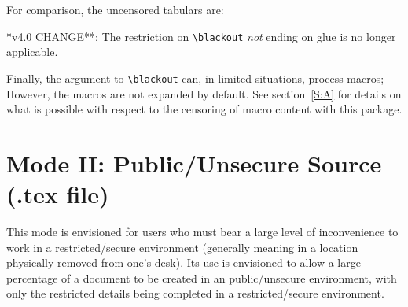 \documentclass{article}
\begin{document}

\StopCensoring

For comparison, the uncensored tabulars are:


\endgroup


\noindent**v4.0 CHANGE**:
The restriction on \verb|\blackout| \textit{not} ending on glue
  is no longer applicable.

Finally, the argument to \verb|\blackout| can, in limited situations,
  process macros; However,
  the macros are not expanded by default.
See section~\ref{S:A} for details on what is possible with respect to
  the censoring of macro content with this package.


\section{Mode II: Public/Unsecure Source (.tex file)}

This mode is envisioned for users who must bear a large level of
inconvenience to work in a restricted/secure environment (generally
meaning in a location physically removed from one's desk).  Its use is
envisioned to allow a large percentage of a document to be created in an
public/unsecure environment, with only the restricted details being
completed in a restricted/secure environment.
\end{document}
